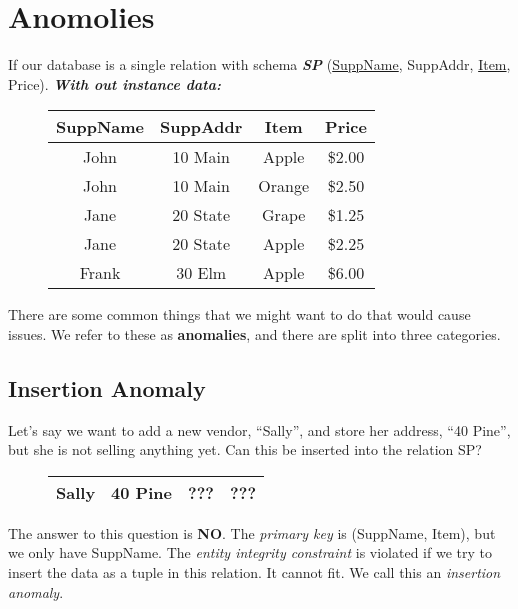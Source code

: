 \documentclass{report}
\begin{document}
    \section{Anomolies}
    If our database is a single relation with schema \textit{\textbf{SP}} (\underline{SuppName}, SuppAddr, \underline{Item}, Price).
    \bigbreak \noindent
    \textit{\textbf{With out instance data:}}
    \begin{figure}[H]
    \centering
    \setlength{\tabcolsep}{30}
    \begin{tabular}{c c c c}
        \hline
        SuppName & SuppAddr & Item & Price \\
        \hline
        John & 10 Main & Apple & \$2.00 \\
        \hline
        John & 10 Main & Orange & \$2.50 \\
        \hline
        Jane & 20 State & Grape & \$1.25 \\
        \hline
        Jane & 20 State & Apple & \$2.25 \\
        \hline
        Frank & 30 Elm & Apple & \$6.00  \\
        \hline
    \end{tabular}
    \end{figure}
    \bigbreak \noindent
    There are some common things that we might want to do that would cause issues. We refer to these as \textbf{anomalies}, and there are split into three categories.
    \subsection*{Insertion Anomaly}
    Let's say we want to add a new vendor, ``Sally'', and store her address, ``40 Pine'', but she is not selling anything yet. Can this be inserted into the relation SP?
    \begin{figure}[H]
    \centering
    \setlength{\tabcolsep}{39}
    \begin{tabular}{c c c c}
        \hline
        Sally & 40 Pine & ???  & ??? \\
        \hline
    \end{tabular}
    \end{figure}
    \bigbreak\noindent The answer to this question is \textbf{NO}. The \textit{primary key} is (SuppName, Item), but we only have SuppName. The \textit{entity integrity constraint} is violated if we try to insert the data as a tuple in this relation. It cannot fit. We call this an \textit{insertion anomaly}.
\end{document}
